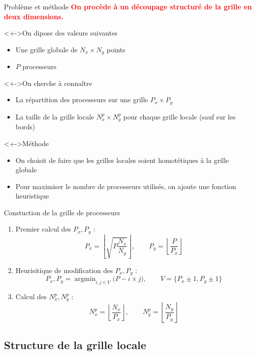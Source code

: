 \documentclass[17pt]{beamer}
\newenvironment{blockitemize}[1]{
  \begin{block}<+->{#1}
    \begin{itemize}
    }{
    \end{itemize}
  \end{block}
}
\begin{document}
\begin{frame}{Problème et méthode}
 \textcolor{red}{\textbf{On procède à un découpage structuré de la grille en deux dimensions.}}
  \begin{blockitemize}{On dipose des valeurs suivantes }
  \item Une grille globale de $N_x\times N_y$ points
  \item $P$ processeurs
  \end{blockitemize}

  \begin{blockitemize}{On cherche à connaître}  
  \item La répartition des processeurs sur une grille $P_x\times P_y$ 
  \item La taille de la grille locale $N^p_x\times N^p_y$ pour chaque grille locale (sauf sur les bords)
  \end{blockitemize}
  
  \begin{blockitemize}{Méthode}
  \item On choisit de faire que les grilles locales soient homotétiques à la grille globale 
  \item Pour maximiser le nombre de processeurs utilisés, on ajoute une fonction heuristique
  \end{blockitemize}
\end{frame}


\begin{frame}{Constuction de la grille de processeurs}
  \begin{enumerate}
  \item Premier calcul des $P_x, P_y$ : 
    \[P_x = \left\lfloor\sqrt{P\frac{N_x}{N_y}}\right\rfloor, \qquad P_y =
      \left\lfloor\frac{P}{P_x}\right\rfloor \]
  \item Heurisitique de modification des $P_x, P_y$ :
    \[P_x, P_y = \mathop{\text{argmin}}_{i,j\in V}\big(P - i  \times j\big), \qquad V = \{P_x\pm1,P_y\pm1\}\]
  \item Calcul des $N^p_x, N^p_y$ : 
    \[N^p_x = \left\lfloor\frac{N_x}{P_x}\right\rfloor, \qquad N^p_y = \left\lfloor\frac{N_y}{P_y}\right\rfloor\]
  \end{enumerate}
\end{frame}

\subsection{Structure de la grille locale}

\end{document}
